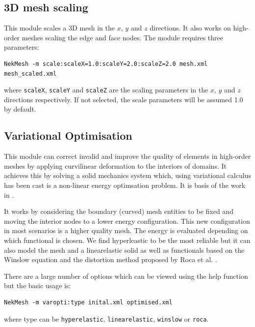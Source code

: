 \subsection{3D mesh scaling}
This module scales a 3D mesh in the $x$, $y$ and $z$ directions. It also works on
high-order meshes scaling the edge and face nodes. The module requires three parameters:

\begin{lstlisting}[style=BashInputStyle]
  NekMesh -m scale:scaleX=1.0:scaleY=2.0:scaleZ=2.0 mesh.xml mesh_scaled.xml
\end{lstlisting}

where \texttt{scaleX}, \texttt{scaleY} and \texttt{scaleZ} are the scaling
parameters in the $x$, $y$ and $z$ directions respectively. If not selected,
the scale parameters will be assumed 1.0 by default. 


\subsection{Variational Optimisation}
\label{sec:varopti}
This module can correct invalid and improve the quality of elements in
high-order meshes by applying curvilinear deformation to the interiors of
domains. It achieves this by solving a solid mechanics system which, using
variational calculus has been cast is a non-linear energy optimsation problem.
It is basis of the work in \cite{TuPeMo16}.

It works by considering the boundary (curved) mesh entities to be fixed and
moving the interior nodes to a lower  energy configuration. This new
configuration in most scenarios is a higher quality mesh. The energy is
evaluated depending on which functional is chosen. We find hyperleastic to be
the most reliable but it can also model the mesh and a linearelastic solid as
well as functionals based on the Winslow equation and the distortion method
proposed by Roca et al. \cite{GaRoPeSa15}.

There are a large number of options which can be viewed using the help function
but the basic usage is:
\begin{lstlisting}[style=BashInputStyle]
  NekMesh -m varopti:type inital.xml optimised.xml
\end{lstlisting}

where type can be \texttt{hyperelastic}, \texttt{linearelastic},
\texttt{winslow} or \texttt{roca}.

